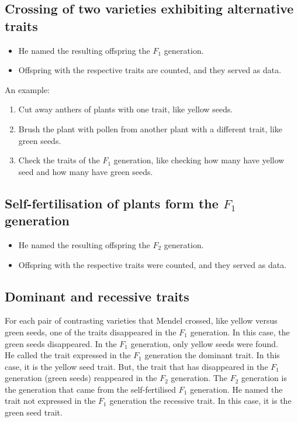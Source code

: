 \documentclass[11pt]{article}
\begin{document}
\subsection{Crossing of two varieties exhibiting alternative traits}
\label{sec:org649726b}
\begin{itemize}
\item He named the resulting offspring the \(F_1\) generation.
\item Offspring with the respective traits are counted, and they served as data.
\end{itemize}

An example:
\begin{enumerate}
\item Cut away anthers of plants with one trait, like yellow seeds.
\item Brush the plant with pollen from another plant with a different trait, like green seeds.
\item Check the traits of the \(F_1\) generation, like checking how many have yellow seed and how many have green seeds.
\end{enumerate}

\subsection{Self-fertilisation of plants form the \(F_1\) generation}
\label{sec:orgb0315f3}
\begin{itemize}
\item He named the resulting offspring the \(F_2\) generation.
\item Offspring with the respective traits were counted, and they served as data.
\end{itemize}

\subsection{Dominant and recessive traits}
\label{sec:orgc9b32d0}
For each pair of contrasting varieties that Mendel crossed, like yellow versus green seeds, one of the traits disappeared in the \(F_1\) generation. In this case, the green seeds disappeared. In the \(F_1\) generation, only yellow seeds were found.
\\[0pt]

He called the trait expressed in the \(F_1\) generation the dominant trait. In this case, it is the yellow seed trait. But, the trait that has disappeared in the \(F_1\) generation (green seeds) reappeared in the \(F_2\) generation. The \(F_2\) generation is the generation that came from the self-fertilised \(F_1\) generation. He named the trait not expressed in the \(F_1\) generation the recessive trait. In this case, it is the green seed trait.
\end{document}
